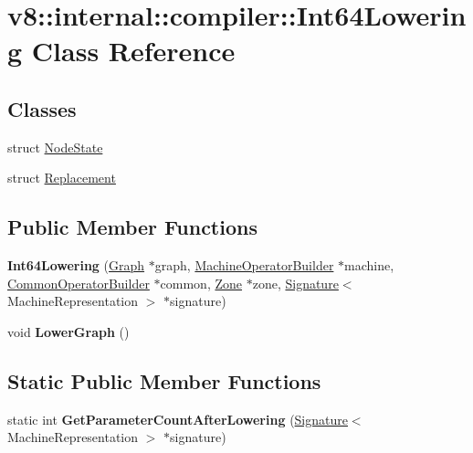 \hypertarget{classv8_1_1internal_1_1compiler_1_1_int64_lowering}{}\section{v8\+:\+:internal\+:\+:compiler\+:\+:Int64\+Lowering Class Reference}
\label{classv8_1_1internal_1_1compiler_1_1_int64_lowering}
\subsection*{Classes}
\begin{DoxyCompactItemize}
\item 
struct \hyperlink{structv8_1_1internal_1_1compiler_1_1_int64_lowering_1_1_node_state}{Node\+State}
\item 
struct \hyperlink{structv8_1_1internal_1_1compiler_1_1_int64_lowering_1_1_replacement}{Replacement}
\end{DoxyCompactItemize}
\subsection*{Public Member Functions}
\begin{DoxyCompactItemize}
\item 
{\bfseries Int64\+Lowering} (\hyperlink{classv8_1_1internal_1_1compiler_1_1_graph}{Graph} $\ast$graph, \hyperlink{classv8_1_1internal_1_1compiler_1_1_machine_operator_builder}{Machine\+Operator\+Builder} $\ast$machine, \hyperlink{classv8_1_1internal_1_1compiler_1_1_common_operator_builder}{Common\+Operator\+Builder} $\ast$common, \hyperlink{classv8_1_1internal_1_1_zone}{Zone} $\ast$zone, \hyperlink{classv8_1_1internal_1_1_signature}{Signature}$<$ Machine\+Representation $>$ $\ast$signature)\hypertarget{classv8_1_1internal_1_1compiler_1_1_int64_lowering_ac38833d8906d52be233f57cbd5dea980}{}\label{classv8_1_1internal_1_1compiler_1_1_int64_lowering_ac38833d8906d52be233f57cbd5dea980}

\item 
void {\bfseries Lower\+Graph} ()\hypertarget{classv8_1_1internal_1_1compiler_1_1_int64_lowering_ac51d0bc0181a103e5f091d93c5951781}{}\label{classv8_1_1internal_1_1compiler_1_1_int64_lowering_ac51d0bc0181a103e5f091d93c5951781}

\end{DoxyCompactItemize}
\subsection*{Static Public Member Functions}
\begin{DoxyCompactItemize}
\item 
static int {\bfseries Get\+Parameter\+Count\+After\+Lowering} (\hyperlink{classv8_1_1internal_1_1_signature}{Signature}$<$ Machine\+Representation $>$ $\ast$signature)\hypertarget{classv8_1_1internal_1_1compiler_1_1_int64_lowering_ac188b7289ff3213f6ce231e980f88690}{}\label{classv8_1_1internal_1_1compiler_1_1_int64_lowering_ac188b7289ff3213f6ce231e980f88690}

\end{DoxyCompactItemize}
